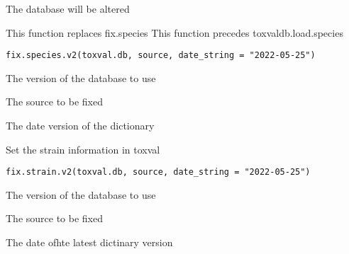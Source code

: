 \documentclass[letterpaper]{book}
\begin{document}
%
\begin{Value}
The database will be altered
\end{Value}
%
\begin{Description}\relax
This function replaces fix.species
This function precedes toxvaldb.load.species
\end{Description}
%
\begin{Usage}
\begin{verbatim}
fix.species.v2(toxval.db, source, date_string = "2022-05-25")
\end{verbatim}
\end{Usage}
%
\begin{Arguments}
\begin{ldescription}
\item[\code{toxval.db}] The version of the database to use

\item[\code{source}] The source to be fixed

\item[\code{date\_string}] The date version of the dictionary
\end{ldescription}
\end{Arguments}
%
\begin{Description}\relax
Set the strain information in toxval
\end{Description}
%
\begin{Usage}
\begin{verbatim}
fix.strain.v2(toxval.db, source, date_string = "2022-05-25")
\end{verbatim}
\end{Usage}
%
\begin{Arguments}
\begin{ldescription}
\item[\code{toxval.db}] The version of the database to use

\item[\code{source}] The source to be fixed

\item[\code{date\_string}] The date ofhte latest dictinary version
\end{ldescription}
\end{Arguments}
%
\end{document}
